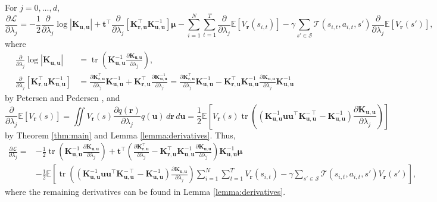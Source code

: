 \documentclass{article}
\theoremstyle{definition}
\theoremstyle{remark}
\DeclareMathOperator{\tr}{tr}
\newcommand{\Kuu}{\mathbf{K}_{\mathbf{u},\mathbf{u}}}
\newcommand{\Kru}{\mathbf{K}_{\mathbf{r},\mathbf{u}}}
\newcommand{\V}{V_{\mathbf{r}}}
\newcommand{\dlj}{\frac{\partial}{\partial \lambda_j}}
\newcommand{\dx}{\,d\mathbf{r}\,d\mathbf{u}}
\begin{document}
For $j = 0, \dots, d$,
\[
  \frac{\partial \mathcal{L}}{\partial \lambda_j} = - \frac{1}{2}\dlj\log|\Kuu|
  + \mathbf{t}^\intercal\dlj \left[ \Kru^\intercal\Kuu^{-1} \right] \bm\mu -
  \sum_{i=1}^N \sum_{t=1}^T \dlj\mathbb{E}[\V(s_{i,t})] -
  \gamma\sum_{s' \in \mathcal{S}} \mathcal{T}(s_{i,t}, a_{i,t},
  s')\dlj\mathbb{E}[\V(s')],
\]
where
\begin{align*}
  \dlj\log|\Kuu| &= \tr \left( \Kuu^{-1} \frac{\partial \Kuu}{\partial \lambda_j}
  \right), \\
  \dlj \left[ \Kru^\intercal\Kuu^{-1} \right] &= \frac{\partial
    \Kru^\intercal}{\partial \lambda_j} \Kuu^{-1} + \Kru^\intercal
  \frac{\partial \Kuu^{-1}}{\partial \lambda_j} = \frac{\partial
    \Kru^\intercal}{\partial \lambda_j} \Kuu^{-1} -
  \Kru^\intercal\Kuu^{-1}\frac{\partial \Kuu}{\partial \lambda_j}\Kuu^{-1}
\end{align*}
by Petersen and Pedersen \cite{petersen2008matrix}, and
\[
  \dlj \mathbb{E}[\V(s)] = \iint\V(s)\frac{\partial q(\mathbf{r})}{\partial
    \lambda_j}q(\mathbf{u})\dx = \frac{1}{2}\mathbb{E} \left[ \V(s) \tr
    \left((\Kuu^{-1}\mathbf{u}\mathbf{u}^\intercal\Kuu^{-\intercal} - \Kuu^{-1})
      \frac{\partial \Kuu}{\partial \lambda_j} \right) \right]
\]
by Theorem \ref{thm:main} and Lemma \ref{lemma:derivatives}. Thus,
\[
  \begin{split}
    \frac{\partial \mathcal{L}}{\partial \lambda_j} = &- \frac{1}{2} \tr
    \left(\Kuu^{-1} \frac{\partial \Kuu}{\partial \lambda_j} \right) +
    \mathbf{t}^\intercal \left( \frac{\partial \Kru^\intercal}{\partial
        \lambda_j} - \Kru^\intercal\Kuu^{-1}\frac{\partial
        \Kuu}{\partial \lambda_j} \right) \Kuu^{-1} \bm\mu \\
    &- \frac{1}{2} \mathbb{E} \left[ \tr \left(
        (\Kuu^{-1}\mathbf{u}\mathbf{u}^\intercal\Kuu^{-\intercal} - \Kuu^{-1})
        \frac{\partial \Kuu}{\partial \lambda_j} \right) \sum_{i=1}^N
      \sum_{t=1}^T \V(s_{i,t}) - \gamma\sum_{s' \in \mathcal{S}}
      \mathcal{T}(s_{i,t}, a_{i,t}, s') \V(s') \right],
  \end{split}
\]
where the remaining derivatives can be found in Lemma \ref{lemma:derivatives}.



\end{document}
